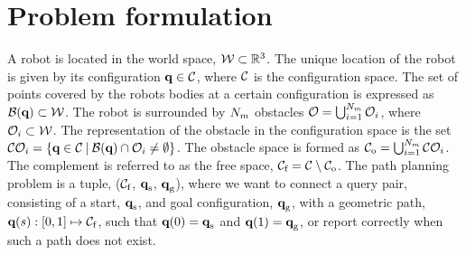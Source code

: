 \documentclass[../main.tex]{subfiles}
\begin{document}
\section{Problem formulation}
A robot is located in the world space, $\mathcal{W} \subset \mathbb{R}^3 $. The unique location of the robot is given by its configuration $\textbf{q} \in \mathcal{C}$, where $\mathcal{C}$ is the configuration space. The set of points covered by the robots bodies at a certain configuration is expressed as $\mathcal{B}(\textbf{q}) \subset \mathcal{W}$. The robot is surrounded by $N_{m}$ obstacles $\mathcal{O} = \bigcup_{i=1}^{N_{m}} \mathcal{O}_i$, where  $\mathcal{O}_i \subset \mathcal{W}$. The representation of the obstacle in the configuration space is the set $\mathcal{C}\mathcal{O}_i = \{\textbf{q} \in \mathcal{C} \: |\: \mathcal{B}(\textbf{q}) \cap \mathcal{O}_i \neq \emptyset \}$. The obstacle space is formed as $\mathcal{C}_{\text{o}} = \bigcup_{i=1}^{N_{m}} \mathcal{C} \mathcal{O}_i$. The complement is referred to as the free space, $\mathcal{C}_{\text{f}} = \mathcal{C} \setminus \mathcal{C}_{\text{o}}$. The path planning problem is a tuple, ($\mathcal{C}_{\text{f}}$, $\textbf{q}_{\text{s}}$, $\textbf{q}_{\text{g}}$), where we want to connect a query pair, consisting of a start, $\textbf{q}_{\text{s}}$, and goal configuration, $\textbf{q}_{\text{g}}$, with a geometric path, $\textbf{q}(s): [0, 1] \mapsto \mathcal{C}_{\text{f}}$, such that $\textbf{q}(0)=\textbf{q}_{\text{s}}$ and $\textbf{q}(1)=\textbf{q}_{\text{g}}$, or report correctly when such a path does not exist.
\end{document}
